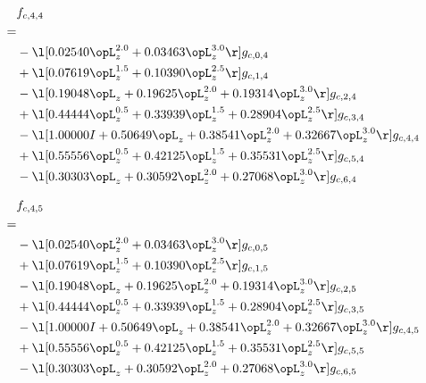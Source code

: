 \begin{alignat}{2} 
\label{eq:f_44_0} 
& f_{c,4,4} \nonumber \\ 
 = \\ 
& - \l[  0.02540 \opL_z^{2.0} +  0.03463 \opL_z^{3.0}  \r] g_{c,0,4} \nonumber \\ 
& + \l[  0.07619 \opL_z^{1.5} +  0.10390 \opL_z^{2.5}  \r] g_{c,1,4} \nonumber \\ 
& - \l[  0.19048 \opL_z +  0.19625 \opL_z^{2.0} +  0.19314 \opL_z^{3.0}  \r] g_{c,2,4} \nonumber \\ 
& + \l[  0.44444 \opL_z^{0.5} +  0.33939 \opL_z^{1.5} +  0.28904 \opL_z^{2.5}  \r] g_{c,3,4} \nonumber \\ 
& - \l[  1.00000 I +  0.50649 \opL_z +  0.38541 \opL_z^{2.0} +  0.32667 \opL_z^{3.0}  \r] g_{c,4,4} \nonumber \\ 
& + \l[  0.55556 \opL_z^{0.5} +  0.42125 \opL_z^{1.5} +  0.35531 \opL_z^{2.5}  \r] g_{c,5,4} \nonumber \\ 
& - \l[  0.30303 \opL_z +  0.30592 \opL_z^{2.0} +  0.27068 \opL_z^{3.0}  \r] g_{c,6,4} \nonumber \\ 
\end{alignat} 


\begin{alignat}{2} 
\label{eq:f_45_0} 
& f_{c,4,5} \nonumber \\ 
 = \\ 
& - \l[  0.02540 \opL_z^{2.0} +  0.03463 \opL_z^{3.0}  \r] g_{c,0,5} \nonumber \\ 
& + \l[  0.07619 \opL_z^{1.5} +  0.10390 \opL_z^{2.5}  \r] g_{c,1,5} \nonumber \\ 
& - \l[  0.19048 \opL_z +  0.19625 \opL_z^{2.0} +  0.19314 \opL_z^{3.0}  \r] g_{c,2,5} \nonumber \\ 
& + \l[  0.44444 \opL_z^{0.5} +  0.33939 \opL_z^{1.5} +  0.28904 \opL_z^{2.5}  \r] g_{c,3,5} \nonumber \\ 
& - \l[  1.00000 I +  0.50649 \opL_z +  0.38541 \opL_z^{2.0} +  0.32667 \opL_z^{3.0}  \r] g_{c,4,5} \nonumber \\ 
& + \l[  0.55556 \opL_z^{0.5} +  0.42125 \opL_z^{1.5} +  0.35531 \opL_z^{2.5}  \r] g_{c,5,5} \nonumber \\ 
& - \l[  0.30303 \opL_z +  0.30592 \opL_z^{2.0} +  0.27068 \opL_z^{3.0}  \r] g_{c,6,5} \nonumber \\ 
\end{alignat} 


